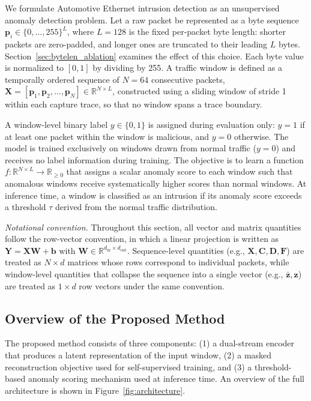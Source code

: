 We formulate Automotive Ethernet intrusion detection as an unsupervised anomaly detection problem. Let a raw packet be represented as a byte sequence $\mathbf{p}_i \in \{0, \ldots, 255\}^{L}$, where $L = 128$ is the fixed per-packet byte length: shorter packets are zero-padded, and longer ones are truncated to their leading $L$ bytes. Section~\ref{sec:bytelen_ablation} examines the effect of this choice. Each byte value is normalized to $[0, 1]$ by dividing by 255. A traffic window is defined as a temporally ordered sequence of $N = 64$ consecutive packets, $\mathbf{X} = [\mathbf{p}_1, \mathbf{p}_2, \ldots, \mathbf{p}_N] \in \mathbb{R}^{N \times L}$, constructed using a sliding window of stride 1 within each capture trace, so that no window spans a trace boundary.

A window-level binary label $y \in \{0, 1\}$ is assigned during evaluation only: $y = 1$ if at least one packet within the window is malicious, and $y = 0$ otherwise. The model is trained exclusively on windows drawn from normal traffic ($y = 0$) and receives no label information during training. The objective is to learn a function $f: \mathbb{R}^{N \times L} \rightarrow \mathbb{R}_{\geq 0}$ that assigns a scalar anomaly score to each window such that anomalous windows receive systematically higher scores than normal windows. At inference time, a window is classified as an intrusion if its anomaly score exceeds a threshold $\tau$ derived from the normal traffic distribution.

\noindent\textit{Notational convention.} Throughout this section, all vector and matrix quantities follow the row-vector convention, in which a linear projection is written as $\mathbf{Y} = \mathbf{X}\mathbf{W} + \mathbf{b}$ with $\mathbf{W} \in \mathbb{R}^{d_{\text{in}} \times d_{\text{out}}}$. Sequence-level quantities (e.g., $\mathbf{X}, \mathbf{C}, \mathbf{D}, \mathbf{F}$) are treated as $N \times d$ matrices whose rows correspond to individual packets, while window-level quantities that collapse the sequence into a single vector (e.g., $\bar{\mathbf{z}}, \mathbf{z}$) are treated as $1 \times d$ row vectors under the same convention.

\subsection{Overview of the Proposed Method}
The proposed method consists of three components: (1) a dual-stream encoder that produces a latent representation of the input window, (2) a masked reconstruction objective used for self-supervised training, and (3) a threshold-based anomaly scoring mechanism used at inference time. An overview of the full architecture is shown in Figure~\ref{fig:architecture}.

